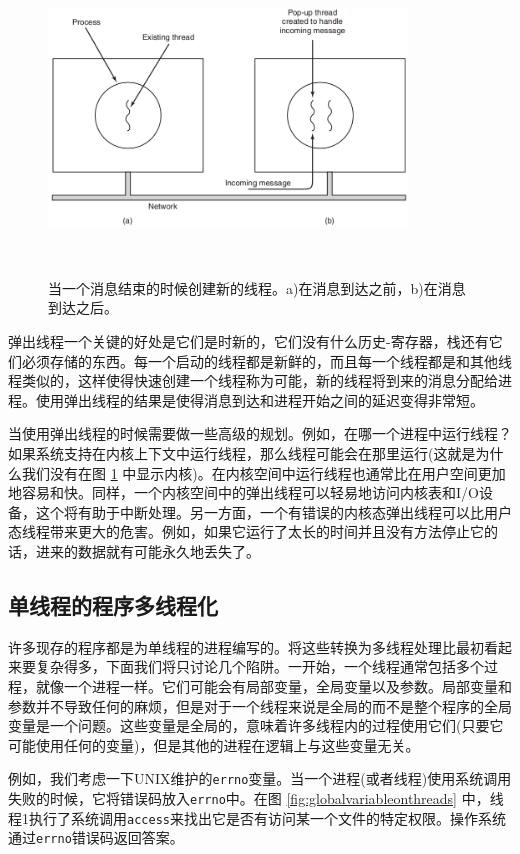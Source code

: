 	\begin{figure}[ht]\small
		\centering
		\includegraphics[width=0.85\textwidth]{FIG/2-18.png}
		\caption{当一个消息结束的时候创建新的线程。a)在消息到达之前，b)在消息到达之后。}　\label{fig:pop-upthreads}
	\end{figure}

	弹出线程一个关键的好处是它们是时新的，它们没有什么历史-寄存器，栈还有它们必须存储的东西。每一个启动的线程都是新鲜的，而且每一个线程都是和其他线程类似的，这样使得快速创建一个线程称为可能，新的线程将到来的消息分配给进程。使用弹出线程的结果是使得消息到达和进程开始之间的延迟变得非常短。
	
	当使用弹出线程的时候需要做一些高级的规划。例如，在哪一个进程中运行线程？如果系统支持在内核上下文中运行线程，那么线程可能会在那里运行(这就是为什么我们没有在图 \ref{fig:pop-upthreads} 中显示内核)。在内核空间中运行线程也通常比在用户空间更加地容易和快。同样，一个内核空间中的弹出线程可以轻易地访问内核表和I/O设备，这个将有助于中断处理。另一方面，一个有错误的内核态弹出线程可以比用户态线程带来更大的危害。例如，如果它运行了太长的时间并且没有方法停止它的话，进来的数据就有可能永久地丢失了。
	
	\subsection{单线程的程序多线程化}
	
	许多现存的程序都是为单线程的进程编写的。将这些转换为多线程处理比最初看起来要复杂得多，下面我们将只讨论几个陷阱。一开始，一个线程通常包括多个过程，就像一个进程一样。它们可能会有局部变量，全局变量以及参数。局部变量和参数并不导致任何的麻烦，但是对于一个线程来说是全局的而不是整个程序的全局变量是一个问题。这些变量是全局的，意味着许多线程内的过程使用它们(只要它可能使用任何的变量)，但是其他的进程在逻辑上与这些变量无关。
	
	例如，我们考虑一下UNIX维护的\texttt{errno}变量。当一个进程(或者线程)使用系统调用失败的时候，它将错误码放入\texttt{errno}中。在图 \ref{fig:globalvariableonthreads} 中，线程1执行了系统调用\texttt{access}来找出它是否有访问某一个文件的特定权限。操作系统通过\texttt{errno}错误码返回答案。
	
